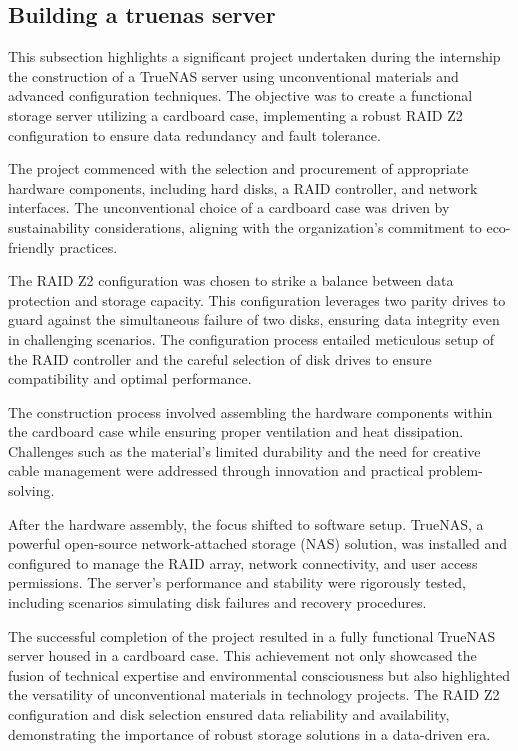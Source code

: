 \subsection{Building a truenas server}
This subsection highlights a significant project undertaken during the internship the construction of a TrueNAS server using unconventional materials and advanced configuration techniques. The objective was to create a functional storage server utilizing a cardboard case, implementing a robust RAID Z2 configuration to ensure data redundancy and fault tolerance.

The project commenced with the selection and procurement of appropriate hardware components, including hard disks, a RAID controller, and network interfaces. The unconventional choice of a cardboard case was driven by sustainability considerations, aligning with the organization's commitment to eco-friendly practices.

The RAID Z2 configuration was chosen to strike a balance between data protection and storage capacity. This configuration leverages two parity drives to guard against the simultaneous failure of two disks, ensuring data integrity even in challenging scenarios. The configuration process entailed meticulous setup of the RAID controller and the careful selection of disk drives to ensure compatibility and optimal performance.

The construction process involved assembling the hardware components within the cardboard case while ensuring proper ventilation and heat dissipation. Challenges such as the material's limited durability and the need for creative cable management were addressed through innovation and practical problem-solving.

After the hardware assembly, the focus shifted to software setup. TrueNAS, a powerful open-source network-attached storage (NAS) solution, was installed and configured to manage the RAID array, network connectivity, and user access permissions. The server's performance and stability were rigorously tested, including scenarios simulating disk failures and recovery procedures.

The successful completion of the project resulted in a fully functional TrueNAS server housed in a cardboard case. This achievement not only showcased the fusion of technical expertise and environmental consciousness but also highlighted the versatility of unconventional materials in technology projects. The RAID Z2 configuration and disk selection ensured data reliability and availability, demonstrating the importance of robust storage solutions in a data-driven era.

